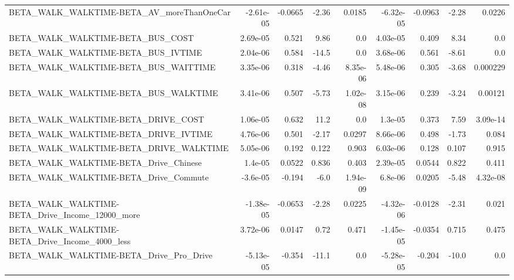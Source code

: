 \begin{tabular}{lrrrrrrrr}
BETA\_WALK\_WALKTIME-BETA\_AV\_moreThanOneCar          &   -2.61e-05 &      -0.0665 &     -2.36 &   0.0185 &  -6.32e-05 &     -0.0963 &        -2.28 &        0.0226 \\
BETA\_WALK\_WALKTIME-BETA\_BUS\_COST                   &    2.69e-05 &        0.521 &      9.86 &      0.0 &   4.03e-05 &       0.409 &         8.34 &           0.0 \\
BETA\_WALK\_WALKTIME-BETA\_BUS\_IVTIME                 &    2.04e-06 &        0.584 &     -14.5 &      0.0 &   3.68e-06 &       0.561 &        -8.61 &           0.0 \\
BETA\_WALK\_WALKTIME-BETA\_BUS\_WAITTIME               &    3.35e-06 &        0.318 &     -4.46 & 8.35e-06 &   5.48e-06 &       0.305 &        -3.68 &      0.000229 \\
BETA\_WALK\_WALKTIME-BETA\_BUS\_WALKTIME               &    3.41e-06 &        0.507 &     -5.73 & 1.02e-08 &   3.15e-06 &       0.239 &        -3.24 &       0.00121 \\
BETA\_WALK\_WALKTIME-BETA\_DRIVE\_COST                 &    1.06e-05 &        0.632 &      11.2 &      0.0 &    1.3e-05 &       0.373 &         7.59 &      3.09e-14 \\
BETA\_WALK\_WALKTIME-BETA\_DRIVE\_IVTIME               &    4.76e-06 &        0.501 &     -2.17 &   0.0297 &   8.66e-06 &       0.498 &        -1.73 &         0.084 \\
BETA\_WALK\_WALKTIME-BETA\_DRIVE\_WALKTIME             &    5.05e-06 &        0.192 &     0.122 &    0.903 &   6.03e-06 &       0.128 &        0.107 &         0.915 \\
BETA\_WALK\_WALKTIME-BETA\_Drive\_Chinese              &     1.4e-05 &       0.0522 &     0.836 &    0.403 &   2.39e-05 &      0.0544 &        0.822 &         0.411 \\
BETA\_WALK\_WALKTIME-BETA\_Drive\_Commute              &    -3.6e-05 &       -0.194 &      -6.0 & 1.94e-09 &    6.8e-06 &      0.0205 &        -5.48 &      4.32e-08 \\
BETA\_WALK\_WALKTIME-BETA\_Drive\_Income\_12000\_more    &   -1.38e-05 &      -0.0653 &     -2.28 &   0.0225 &  -4.32e-06 &     -0.0128 &        -2.31 &         0.021 \\
BETA\_WALK\_WALKTIME-BETA\_Drive\_Income\_4000\_less     &    3.72e-06 &       0.0147 &      0.72 &    0.471 &  -1.45e-05 &     -0.0354 &        0.715 &         0.475 \\
BETA\_WALK\_WALKTIME-BETA\_Drive\_Pro\_Drive            &   -5.13e-05 &       -0.354 &     -11.1 &      0.0 &  -5.28e-05 &      -0.204 &        -10.0 &           0.0 \\

\end{tabular}
